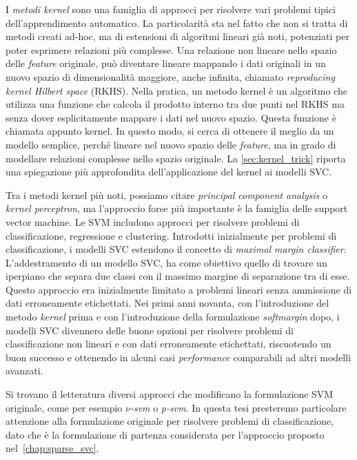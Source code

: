 I \emph{metodi kernel}\cite{2007_kernel_methods} sono una famiglia di approcci per risolvere vari problemi tipici dell'apprendimento automatico. La particolarità sta nel fatto che non si tratta di metodi creati ad-hoc, ma di estensioni di algoritmi lineari già noti, potenziati per poter esprimere relazioni più complesse.
Una relazione non lineare nello spazio delle \emph{feature} originale, può diventare lineare mappando i dati originali in un nuovo spazio di dimensionalità maggiore, anche infinita, chiamato \emph{reproducing kernel Hilbert space} (RKHS).
Nella pratica, un metodo kernel è un algoritmo che utilizza una funzione che calcola il prodotto interno tra due punti nel RKHS ma senza dover esplicitamente mappare i dati nel nuovo spazio. Questa funzione è chiamata appunto kernel.
In questo modo, si cerca di ottenere il meglio da un modello semplice, perché lineare nel nuovo spazio delle \emph{feature}, ma in grado di modellare relazioni complesse nello spazio originale.
La \cref{sec:kernel_trick} riporta una spiegazione più approfondita dell'applicazione del kernel ai modelli SVC.

Tra i metodi kernel più noti, possiamo citare \emph{principal component analysis} o \emph{kernel perceptron}, ma l'approccio forse più importante è la famiglia delle support vector machine. 
Le SVM includono approcci per risolvere problemi di classificazione, regressione e clustering.
Introdotti inizialmente per problemi di classificazione, i modelli SVC estendono il concetto di \emph{maximal margin classifier}. L'addestramento di un modello SVC, ha come obiettivo quello di trovare un iperpiano che separa due classi con il massimo margine di separazione tra di esse. Questo approccio era inizialmente limitato a problemi lineari senza ammissione di dati erroneamente etichettati. Nei primi anni novanta, con l'introduzione del metodo \emph{kernel}\cite{1992_hardmargin_svm} prima e con l'introduzione della formulazione \emph{softmargin}\cite{1995_svm} dopo, i modelli SVC divennero delle buone opzioni per risolvere problemi di classificazione non lineari e con dati erroneamente etichettati, riscuotendo un buon successo e ottenendo in alcuni casi \emph{performance} comparabili ad altri modelli avanzati. 

Si trovano il letteratura diversi approcci che modificano la formulazione SVM originale, come per esempio \emph{$\nu$-svm}\cite{2000_nu_svm} o  \emph{p-svm}\cite{2001_p_svm}.
In questa tesi presteremo particolare attenzione alla formulazione originale per risolvere problemi di classificazione, dato che è la formulazione di partenza considerata per l'approccio proposto nel~\cref{chap:sparse_svc}.

